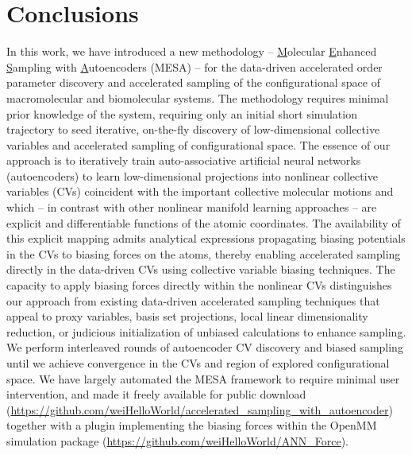 \documentclass[12pt]{article}
\newcommand*{\groen}[1]{#1}
\begin{document}
\section{\sffamily \Large Conclusions} \label{sec:concl}

In this work, we have introduced a new methodology -- \underline{M}olecular \underline{E}nhanced \underline{S}ampling with \underline{A}utoencoders (\groen{MESA}) -- for the data-driven accelerated order parameter discovery and accelerated sampling of the configurational space of macromolecular and biomolecular systems. The methodology requires minimal prior knowledge of the system, requiring only an initial short simulation trajectory to seed iterative, on-the-fly discovery of low-dimensional collective variables and accelerated sampling of configurational space. The essence of our approach is to iteratively train auto-associative artificial neural networks (autoencoders) to learn low-dimensional projections into nonlinear collective variables (\groen{CVs}) coincident with the important collective molecular motions and which -- in contrast with other nonlinear manifold learning approaches -- are explicit and differentiable functions of the atomic coordinates. The availability of this explicit mapping admits analytical expressions propagating biasing potentials in the CVs to biasing forces on the atoms, thereby enabling accelerated sampling directly in the data-driven CVs using collective variable biasing techniques. The capacity to apply biasing forces directly within the nonlinear CVs distinguishes our approach from existing data-driven accelerated sampling techniques that appeal to proxy variables, basis set projections, local linear dimensionality reduction, or judicious initialization of unbiased calculations to enhance sampling. We perform interleaved rounds of autoencoder CV discovery and biased sampling until we achieve convergence in the CVs and region of explored configurational space. We have largely automated the MESA framework to require minimal user intervention, and made it freely available for public download (\url{https://github.com/weiHelloWorld/accelerated_sampling_with_autoencoder}) together with a plugin implementing the biasing forces within the OpenMM simulation package \cite{eastman2017openmm,friedrichs2009accelerating} (\url{https://github.com/weiHelloWorld/ANN_Force}).
\end{document}
